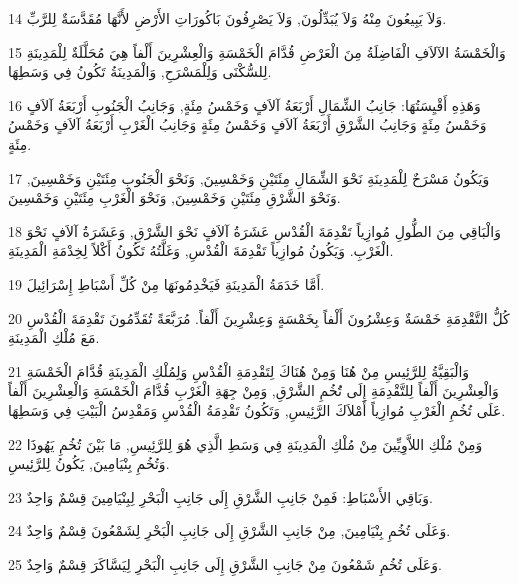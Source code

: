 \par 14 وَلاَ يَبِيعُونَ مِنْهُ وَلاَ يُبَدِّلُونَ, وَلاَ يَصْرِفُونَ بَاكُورَاتِ الأَرْضِ لأَنَّهَا مُقَدَّسَةٌ لِلرَّبِّ.
\par 15 وَالْخَمْسَةُ الآلاَفِ الْفَاضِلَةُ مِنَ الْعَرْضِ قُدَّامَ الْخَمْسَةِ وَالْعِشْرِينَ أَلْفاً هِيَ مُحَلَّلَةٌ لِلْمَدِينَةِ لِلسُّكْنَى وَلِلْمَسْرَحِ, وَالْمَدِينَةُ تَكُونُ فِي وَسَطِهَا.
\par 16 وَهَذِهِ أَقْيِسَتُهَا: جَانِبُ الشِّمَالِ أَرْبَعَةُ آلاَفٍ وَخَمْسُ مِئَةٍ, وَجَانِبُ الْجَنُوبِ أَرْبَعَةُ آلاَفٍ وَخَمْسُ مِئَةٍ وَجَانِبُ الشَّرْقِ أَرْبَعَةُ آلاَفٍ وَخَمْسُ مِئَةٍ وَجَانِبُ الْغَرْبِ أَرْبَعَةُ آلاَفٍ وَخَمْسُ مِئَةٍ.
\par 17 وَيَكُونُ مَسْرَحٌ لِلْمَدِينَةِ نَحْوَ الشِّمَالِ مِئَتَيْنِ وَخَمْسِينَ, وَنَحْوَ الْجَنُوبِ مِئَتَيْنِ وَخَمْسِينَ, وَنَحْوَ الشَّرْقِ مِئَتَيْنِ وَخَمْسِينَ, وَنَحْوَ الْغَرْبِ مِئَتَيْنِ وَخَمْسِينَ.
\par 18 وَالْبَاقِي مِنَ الطُّولِ مُوازِياً تَقْدِمَةَ الْقُدْسِ عَشَرَةُ آلاَفٍ نَحْوَ الشَّرْقِ, وَعَشَرَةُ آلاَفٍ نَحْوَ الْغَرْبِ. وَيَكُونُ مُوازِياً تَقْدِمَةَ الْقُدْسِ, وَغَلَّتُهُ تَكُونُ أَكْلاً لِخِدْمَةِ الْمَدِينَةِ.
\par 19 أَمَّا خَدَمَةُ الْمَدِينَةِ فَيَخْدِمُونَهَا مِنْ كُلِّ أَسْبَاطِ إِسْرَائِيلَ.
\par 20 كُلُّ التَّقْدِمَةِ خَمْسَةٌ وَعِشْرُونَ أَلْفاً بِخَمْسَةٍ وَعِشْرِينَ أَلْفاً. مُرَبَّعَةً تُقَدِّمُونَ تَقْدِمَةَ الْقُدْسِ مَعَ مُلْكِ الْمَدِينَةِ.
\par 21 وَالْبَقِيَّةُ لِلرَّئِيسِ مِنْ هُنَا وَمِنْ هُنَاكَ لِتَقْدِمَةِ الْقُدْسِ وَلِمُلْكِ الْمَدِينَةِ قُدَّامَ الْخَمْسَةِ وَالْعِشْرِينَ أَلْفاً لِلتَّقْدِمَةِ إِلَى تَُخُمِ الشَّرْقِ, وَمِنْ جِهَةِ الْغَرْبِ قُدَّامَ الْخَمْسَةِ وَالْعِشْرِينَ أَلْفاً عَلَى تُخُمِ الْغَرْبِ مُوازِياً أَمْلاَكَ الرَّئِيسِ, وَتَكُونُ تَقْدِمَةُ الْقُدْسِ وَمَقْدِسُ الْبَيْتِ فِي وَسَطِهَا.
\par 22 وَمِنْ مُلْكِ اللاَّوِيِّينَ مِنْ مُلْكِ الْمَدِينَةِ فِي وَسَطِ الَّذِي هُوَ لِلرَّئِيسِ, مَا بَيْنَ تُخُمِ يَهُوذَا وَتُخُمِ بِنْيَامِينَ, يَكُونُ لِلرَّئِيسِ.
\par 23 وَبَاقِي الأَسْبَاطِ: فَمِنْ جَانِبِ الشَّرْقِ إِلَى جَانِبِ الْبَحْرِ لِبِنْيَامِينَ قِسْمٌ وَاحِدٌ.
\par 24 وَعَلَى تُخُمِ بِنْيَامِينَ, مِنْ جَانِبِ الشَّرْقِ إِلَى جَانِبِ الْبَحْرِ لِشَمْعُونَ قِسْمٌ وَاحِدٌ.
\par 25 وَعَلَى تُخُمِ شَمْعُونَ مِنْ جَانِبِ الشَّرْقِ إِلَى جَانِبِ الْبَحْرِ لِيَسَّاكَرَ قِسْمٌ وَاحِدٌ.
